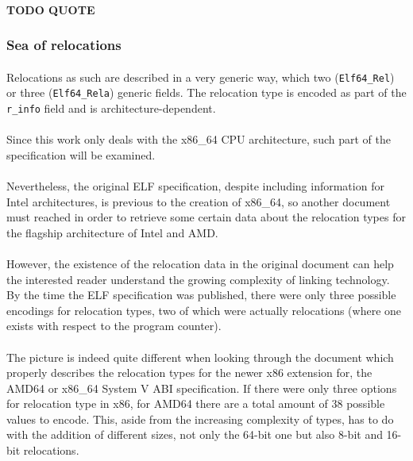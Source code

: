 \documentclass[12pt]{article}
\begin{document}
	\paragraph{TODO QUOTE}
	
	\subsubsection{Sea of relocations}
	\paragraph{}Relocations as such are described in a very generic way, which two (\verb|Elf64_Rel|) or three (\verb|Elf64_Rela|) generic fields. The relocation type is encoded as part of the \verb|r_info| field and is architecture-dependent.
	\paragraph{}Since this work only deals with the x86\_64 CPU architecture, such part of the specification will be examined.
	\paragraph{}Nevertheless, the original ELF specification, despite including information for Intel architectures, is previous to the creation of x86\_64, so another document must reached in order to retrieve some certain data about the relocation types for the flagship architecture of Intel and AMD.
	\paragraph{}However, the existence of the relocation data in the original document can help the interested reader understand the growing complexity of linking technology. By the time the ELF specification was published, there were only three possible encodings for relocation types, two of which were actually relocations (where one exists with respect to the program counter).
	
	\paragraph{}The picture is indeed quite different when looking through the document which properly describes the relocation types for the newer x86 extension for, the AMD64 or x86\_64 System V ABI specification\cite{x86_64-abi-spec}. If there were only three options for relocation type in x86, for AMD64 there are a total amount of 38 possible values to encode. This, aside from the increasing complexity of types, has to do with the addition of different sizes, not only the 64-bit one but also 8-bit and 16-bit relocations.
	
\end{document}
